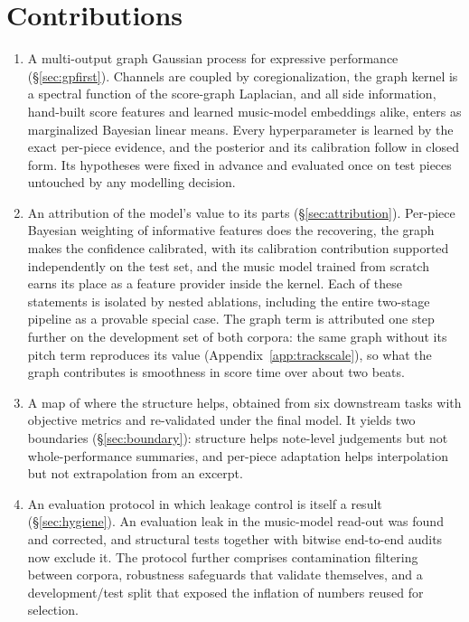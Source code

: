 \section{Contributions}
\begin{enumerate}
  \item A multi-output graph Gaussian process for expressive performance
        (\S\ref{sec:gpfirst}). Channels are coupled by coregionalization,
        the graph kernel is a spectral function of the score-graph
        Laplacian, and all side information, hand-built score features and
        learned music-model embeddings alike, enters as marginalized
        Bayesian linear means. Every hyperparameter is learned by the exact
        per-piece evidence, and the posterior and its calibration follow in
        closed form. Its hypotheses were fixed in advance and evaluated
        once on test pieces untouched by any modelling decision.
  \item An attribution of the model's value to its parts
        (\S\ref{sec:attribution}). Per-piece Bayesian weighting of
        informative features does the recovering, the graph makes the
        confidence calibrated, with its calibration contribution supported
        independently on the test set, and the music model trained from
        scratch earns its place as a feature provider inside the kernel.
        Each of these statements is isolated by nested ablations, including
        the entire two-stage pipeline as a provable special case. The graph
        term is attributed one step further on the development set of both
        corpora: the same graph without its pitch term reproduces its value
        (Appendix~\ref{app:trackscale}), so what the graph contributes is
        smoothness in score time over about two beats.
  \item A map of where the structure helps, obtained from six downstream
        tasks with objective metrics and re-validated under the final
        model. It yields two boundaries (\S\ref{sec:boundary}): structure
        helps note-level judgements but not whole-performance summaries,
        and per-piece adaptation helps interpolation but not extrapolation
        from an excerpt.
  \item An evaluation protocol in which leakage control is itself a result
        (\S\ref{sec:hygiene}). An evaluation leak in the music-model
        read-out was found and corrected, and structural tests together
        with bitwise end-to-end audits now exclude it. The protocol further
        comprises contamination filtering between corpora, robustness
        safeguards that validate themselves, and a development/test split
        that exposed the inflation of numbers reused for selection.
\end{enumerate}
